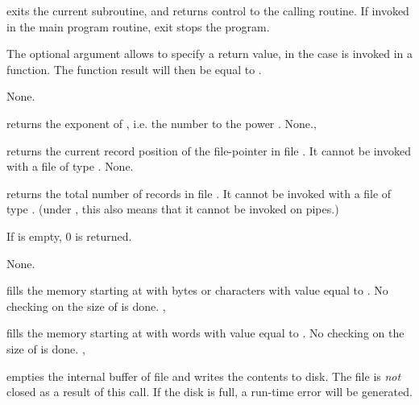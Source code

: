 \documentclass{report}
\begin{document}
{ exits the current subroutine, and returns control to the calling
routine. If invoked in the main program routine, exit stops the program.

The optional argument  allows to specify a return value, in the case
 is invoked in a function. The function result will then be
equal to .}
{None.}
{}



{ returns the exponent of , i.e. the number  to the
power .}
{None.}{, }



{ returns the current record position of the file-pointer in file
. It cannot be invoked with a file of type .}
{None.}
{}



{ returns the total number of records in file . 
It cannot be invoked with a file of type . (under \linux, this
also means that it cannot be invoked on pipes.)

If  is empty, 0 is returned.
}
{None.}
{}



{ fills the memory starting at  with  bytes
or characters with value equal to .
}
{No checking on the size of  is done.}
{, }



{ fills the memory starting at  with  words
with value equal to .
}
{No checking on the size of  is done.}
{, }



{ empties the internal buffer of file  and writes the
contents to disk. The file is \textit{not} closed as a result of this call.}
{If the disk is full, a run-time error will be generated.}
{}


\end{document}
